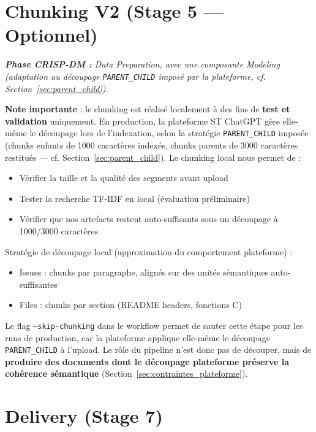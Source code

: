 \documentclass[12pt,a4paper]{report}
\begin{document}
\section{Chunking V2 (Stage 5 --- Optionnel)}

\textit{\small\textbf{\textcolor{stblue}{Phase CRISP-DM :}} Data Preparation, avec une composante Modeling (adaptation au découpage \texttt{PARENT\_CHILD} imposé par la plateforme, cf. Section~\ref{sec:parent_child}).}\par\smallskip

\textbf{Note importante} : le chunking est réalisé localement à des fins de \textbf{test et validation} uniquement. En production, la plateforme ST ChatGPT gère elle-même le découpage lors de l'indexation, selon la stratégie \texttt{PARENT\_CHILD} imposée (chunks enfants de 1000 caractères indexés, chunks parents de 3000 caractères restitués --- cf. Section~\ref{sec:parent_child}). Le chunking local nous permet de :
\begin{itemize}
  \item Vérifier la taille et la qualité des segments avant upload
  \item Tester la recherche TF-IDF en local (évaluation préliminaire)
  \item Vérifier que nos artefacts restent auto-suffisants sous un découpage à 1000/3000 caractères
\end{itemize}

Stratégie de découpage local (approximation du comportement plateforme) :
\begin{itemize}
  \item Issues : chunks par paragraphe, alignés sur des unités sémantiques auto-suffisantes
  \item Files : chunks par section (README headers, fonctions C)
\end{itemize}

Le flag \texttt{--skip-chunking} dans le workflow permet de sauter cette étape pour les runs de production, car la plateforme applique elle-même le découpage \texttt{PARENT\_CHILD} à l'upload. Le rôle du pipeline n'est donc pas de découper, mais de \textbf{produire des documents dont le découpage plateforme préserve la cohérence sémantique} (Section~\ref{sec:contraintes_plateforme}).

\section{Delivery (Stage 7)}
\end{document}
